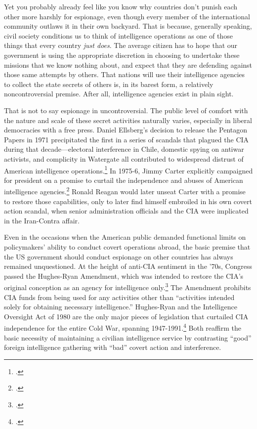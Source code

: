 \documentclass{memoir}
\begin{document}
\begin{refsegment}
Yet you probably already feel like you know why countries don't punish each other more harshly for espionage, even though every member of the international community outlaws it in their own backyard. That is because, generally speaking, civil society conditions us to think of intelligence operations as one of those things that every country \emph{just does}. The average citizen has to hope that our government is using the appropriate discretion in choosing to undertake these missions that we know nothing about, and expect that they are defending against those same attempts by others. That nations will use their intelligence agencies to collect the state secrets of others is, in its barest form, a relatively noncontroversial premise. After all, intelligence agencies exist in plain sight.

That is not to say espionage in uncontroversial. The public level of comfort with the nature and scale of these secret activities naturally varies, especially in liberal democracies with a free press. Daniel Ellsberg's decision to release the Pentagon Papers in 1971 precipitated the first in a series of scandals that plagued the CIA during that decade---electoral interference in Chile, domestic spying on antiwar activists, and complicity in Watergate all contributed to widespread distrust of American intelligence operations.\footcite[p.~214-215]{andrew_missing_1984} In 1975-6, Jimmy Carter explicitly campaigned for president on a promise to curtail the independence and abuses of American intelligence agencies.\footcite[p.~217]{andrew_missing_1984} Ronald Reagan would later unseat Carter with a promise to restore those capabilities, only to later find himself embroiled in his own covert action scandal, when senior administration officials and the CIA were implicated in the Iran-Contra affair.

Even in the occasions when the American public demanded functional limits on policymakers' ability to conduct covert operations abroad, the basic premise that the US government should conduct espionage on other countries has always remained unquestioned. At the height of anti-CIA sentiment in the '70s, Congress passed the Hughes-Ryan Amendment, which was intended to restore the CIA's original conception as an agency for intelligence only.\footcite[p.~215]{andrew_missing_1984} The Amendment prohibits CIA funds from being used for any activities other than ``activities intended solely for obtaining necessary intelligence.'' Hughes-Ryan and the Intelligence Oversight Act of 1980 are the only major pieces of legislation that curtailed CIA independence for the entire Cold War, spanning 1947-1991.\footcite[p.~93-94]{cogan_covert_1993} Both reaffirm the basic necessity of maintaining a civilian intelligence service by contrasting ``good'' foreign intelligence gathering with ``bad'' covert action and interference.


\end{refsegment}
\end{document}
